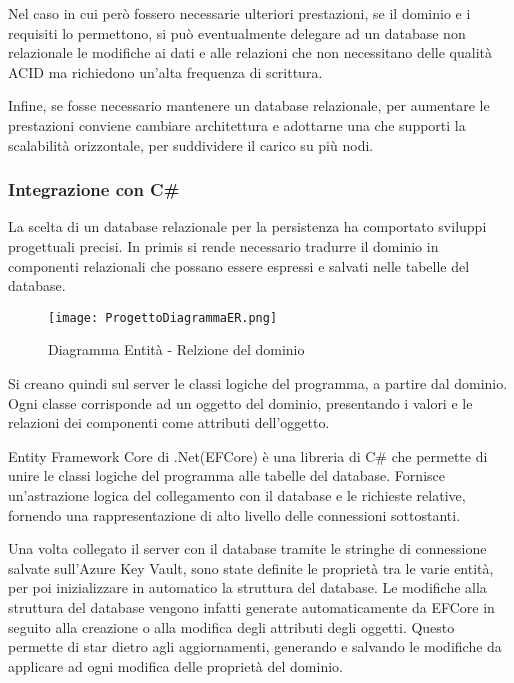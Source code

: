 Nel caso in cui però fossero necessarie ulteriori prestazioni, se il dominio e i requisiti lo permettono, si può eventualmente delegare ad un database non relazionale le modifiche ai dati e alle relazioni che non necessitano delle qualità ACID ma richiedono un’alta frequenza di scrittura. 

Infine, se fosse necessario mantenere un database relazionale, per aumentare le prestazioni conviene cambiare architettura e adottarne una che supporti la scalabilità orizzontale, per suddividere il carico su più nodi.




\subsubsection{ Integrazione con C\#}

La scelta di un database relazionale per la persistenza ha comportato sviluppi progettuali precisi. In primis si rende necessario tradurre il dominio in componenti relazionali che possano essere espressi e salvati nelle tabelle del database.

\begin{figure}[h!]
    \centering
    \texttt{[image: ProgettoDiagrammaER.png]}
    \caption{Diagramma Entità - Relzione del dominio}
\end{figure}	

Si creano quindi sul server le classi logiche del programma, a partire dal dominio. Ogni classe corrisponde ad un oggetto del dominio, presentando i valori e le relazioni dei componenti come attributi dell’oggetto.




Entity Framework Core di .Net(EFCore) è una libreria di C\# che permette di unire le classi logiche del programma alle tabelle del database. Fornisce un’astrazione logica del collegamento con il database e le richieste relative, fornendo una rappresentazione di alto livello delle connessioni sottostanti. 


Una volta collegato il server con il database tramite le stringhe di connessione salvate sull’Azure Key Vault, sono state definite le proprietà tra le varie entità, per poi inizializzare in automatico la struttura del database. Le modifiche alla struttura del database vengono infatti generate automaticamente da EFCore in seguito alla creazione o alla modifica degli attributi degli oggetti. Questo permette di star dietro agli aggiornamenti, generando e salvando le modifiche da applicare ad ogni modifica delle proprietà del dominio.

